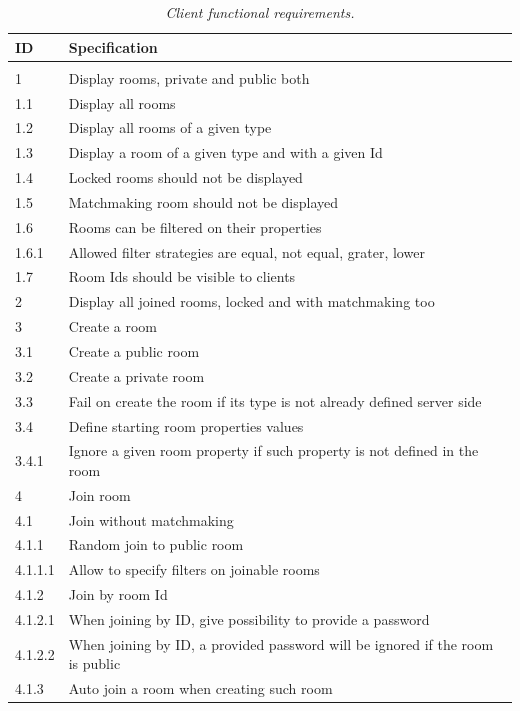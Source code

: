 \begin{center}
  \begin{longtable}{|l|l|} 
    \caption{\textit{Client functional requirements.}} \label{table:client-f-req} \\
 
\hline
ID   &  Specification \\
\hline
\multicolumn{2}{|c|}{} \\
\hline
1       & Display rooms, private and public both \\
1.1     & Display all rooms \\
1.2     & Display all rooms of a given type \\
1.3     & Display a room of a given type and with a given Id \\ 
1.4     & Locked rooms should not be displayed \\
1.5     & Matchmaking room should not be displayed \\
1.6     & Rooms can be filtered on their properties \\
1.6.1   & Allowed filter strategies are equal, not equal, grater, lower \\
1.7     & Room Ids should be visible to clients \\
2       & Display all joined rooms, locked and with matchmaking too \\
3       & Create a room \\
3.1     & Create a public room \\
3.2     & Create a private room \\
3.3     & Fail on  create the room if its type is not already defined server side \\
3.4     & Define starting room properties values \\
3.4.1   & Ignore a given room property if such property is not defined in the room \\
4       & Join room \\
4.1     & Join without matchmaking \\
4.1.1   & Random join to public room \\
4.1.1.1 & Allow to specify filters on joinable rooms \\
4.1.2   & Join by room Id \\
4.1.2.1 & When joining by ID, give possibility to provide a password \\
4.1.2.2 & When joining by ID, a provided password will be ignored if the room is public \\
4.1.3   & Auto join a room when creating such room \\

\end{longtable}
\end{center}
